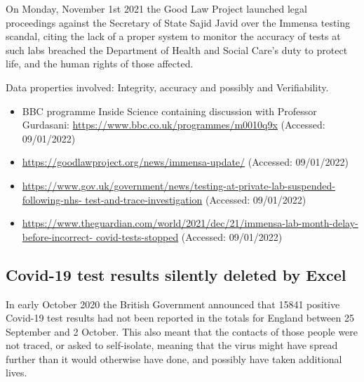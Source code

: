 On Monday, November 1st 2021 the Good Law Project launched legal proceedings against the Secretary of State Sajid Javid over the Immensa testing scandal,
citing the lack of a proper system to monitor the \gls{accuracy} of tests at such labs breached the Department of Health and Social Care's duty to protect life, and the human rights of those affected.

Data properties involved: Integrity, \gls{accuracy} and possibly  and Verifiability.

\begin{itemize}
  \item BBC programme Inside Science containing discussion with Professor Gurdasani: \href{https://www.bbc.co.uk/programmes/m0010q9x}{https://www.bbc.co.uk/programmes/m0010q9x} (Accessed: 09/01/2022)
  \item\href{https://goodlawproject.org/news/immensa-update/}{https://goodlawproject.org/news/immensa-update/} (Accessed: 09/01/2022)
  \item\href{https://www.gov.uk/government/news/testing-at-private-lab-suspended-following-nhs-test-and-trace-investigation}{https://www.gov.uk/government/news/testing-at-private-lab-suspended-following-nhs- test-and-trace-investigation} (Accessed: 09/01/2022)
  \item\href{https://www.theguardian.com/world/2021/dec/21/immensa-lab-month-delay-before-incorrect-covid-tests-stopped}{https://www.theguardian.com/world/2021/dec/21/immensa-lab-month-delay-before-incorrect- covid-tests-stopped} (Accessed: 09/01/2022)
\end{itemize}

\subsection{Covid-19 test results silently deleted by Excel} \label{bkm:incacc:covidexcel}

In early October 2020 the British Government announced that 15841 positive Covid-19 test results had not been reported in the totals for England between 25 September and 2 October. This also meant that the contacts of those people were not traced, or asked to self-isolate, meaning that the virus might have spread further than it would otherwise have done, and possibly have taken additional lives.

